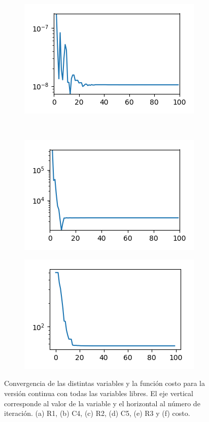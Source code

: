 \documentclass{llncs}
\begin{document}
\begin{figure}[!h]
\begin{subfigure}{0.5\textwidth}
			\caption{}
			\label{fig:F-r2}
		\end{subfigure}%
		\begin{subfigure}{0.5\textwidth}
			\centering
			\includegraphics[scale=0.7]{ContinuoLibre/cc-c5}
			\caption{}
			\label{fig:F-c5}
		\end{subfigure}   \\                                                         
		\begin{subfigure}{0.5\textwidth}
			\centering
			\includegraphics[scale=0.7]{ContinuoLibre/cc-r3}
			\caption{}
			\label{fig:F-r3}
		\end{subfigure}%
		\begin{subfigure}{0.5\textwidth}
			\centering
			\includegraphics[scale=0.7]{ContinuoLibre/cc-costo}
			\caption{}
			\label{fig:F-costo}
		\end{subfigure}                                                            
		\caption{Convergencia de las distintas variables y la función costo para la versión continua con todas las variables libres. El eje vertical 
			corresponde al valor de la variable y el horizontal al número de iteración. (a) R1, (b) C4, (c) R2, (d) 
			C5, (e) R3 y (f) costo. }                                                                                  
		\label{fig:FF}                                                                                  
	\end{figure}
	
\end{document}

